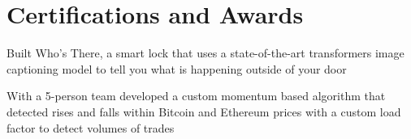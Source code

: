 \documentclass[]{resume-template}
\begin{document}
\begin{minipage}[t]{0.66\textwidth}
	\section{Certifications and Awards}\label{sec:certifications-and-awards}
	\begin{tightemize}
		\item Built Who's There, a smart lock that uses a state-of-the-art transformers image captioning model to tell you what is happening outside of your door
	\end{tightemize}
	\sectionsep{}
	\begin{tightemize}
		\item With a  5-person team developed a custom momentum based algorithm that detected rises and falls within
		Bitcoin and Ethereum prices with a custom load factor to detect volumes of trades
	\end{tightemize}
	\sectionsep{}
	\sectionsep{}



\end{minipage}
\end{document}
